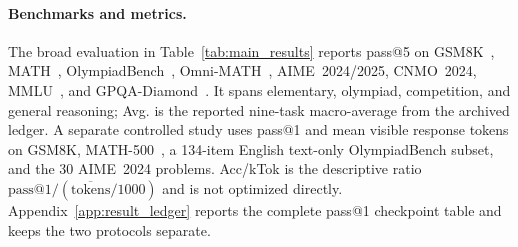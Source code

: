 \paragraph{Benchmarks and metrics.}
The broad evaluation in Table~\ref{tab:main_results} reports pass@5 on GSM8K~\citep{cobbe2021gsm8k}, MATH~\citep{hendrycks2021math}, OlympiadBench~\citep{he2024olympiadbench}, Omni-MATH~\citep{gao2024omnimath}, AIME~2024/2025, CNMO~2024, MMLU~\citep{hendrycks2020mmlu}, and GPQA-Diamond~\citep{rein2023gpqa}. It spans elementary, olympiad, competition, and general reasoning; Avg. is the reported nine-task macro-average from the archived ledger. A separate controlled study uses pass@1 and mean visible response tokens on GSM8K, MATH-500~\citep{lightman2023lets}, a 134-item English text-only OlympiadBench subset, and the 30 AIME~2024 problems. Acc/kTok is the descriptive ratio $\mathrm{pass@1}/(\overline{\mathrm{tokens}}/1000)$ and is not optimized directly. Appendix~\ref{app:result_ledger} reports the complete pass@1 checkpoint table and keeps the two protocols separate.


